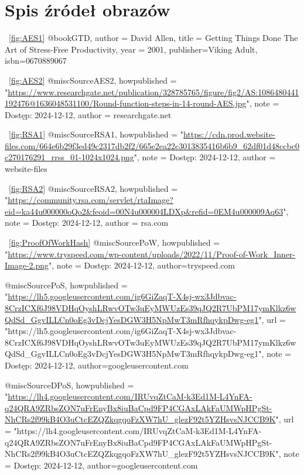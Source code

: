 \chapter{Spis źródeł obrazów}
\label{chap:Zrodla}
\figurename{~\ref{fig:AES1}}
@book{GTD,
author = {David Allen},
title = {Getting Things Done The Art of Stress-Free Productivity},
year = {2001},
publisher={Viking Adult},
isbn={0670889067}
}

\figurename{~\ref{fig:AES2}}
@misc{SourceAES2,
    howpublished = "\url{https://www.researchgate.net/publication/328785765/figure/fig2/AS:1086480441192476@1636048531100/Round-function-steps-in-14-round-AES.jpg}",
    note = {Dostęp: 2024-12-12},
    author = {researchgate.net}
}

\figurename{~\ref{fig:RSA1}}
@misc{SourceRSA1,
    howpublished = "\url{https://cdn.prod.website-files.com/664e6b29f3ed49c2317db2f2/665e2ea22c3013835416b6b9_62df01d48ccbc0c270176291_rrss_01-1024x1024.png}",
    note = {Dostęp: 2024-12-12},
author = {website-files}
}

\figurename{~\ref{fig:RSA2}}
@misc{SourceRSA2,
    howpublished = "\url{https://community.rsa.com/servlet/rtaImage?eid=ka44u000000oQo2&feoid=00N4u000004LDXp&refid=0EM4u000009Aq63}",
    note = {Dostęp: 2024-12-12},
author = {rsa.com}
}

\figurename{~\ref{fig:ProofOfWorkHash}}
@misc{SourcePoW,
    howpublished = "\url{https://www.tryspeed.com/wp-content/uploads/2022/11/Proof-of-Work_Inner-Image-2.png}",
    note = {Dostęp: 2024-12-12},
author={tryspeed.com}
}


@misc{SourcePoS,
    howpublished = "\url{https://lh5.googleusercontent.com/ig6GiZaqT-X4sj-wx3Jdbvac-8CrzICXf6J98VDHqOyshLRwvOTw3uEyMWUzEs39qJQ2R7UbPM17ymKlkz6wQdSd_GgvILLCn0oEg3vDcjYesDGW3H5NpMwT3mRfhqykpDwg-eg1}",
    url = "https://lh5.googleusercontent.com/ig6GiZaqT-X4sj-wx3Jdbvac-8CrzICXf6J98VDHqOyshLRwvOTw3uEyMWUzEs39qJQ2R7UbPM17ymKlkz6wQdSd_GgvILLCn0oEg3vDcjYesDGW3H5NpMwT3mRfhqykpDwg-eg1",
    note = {Dostęp: 2024-12-12},
author={googleusercontent.com}
}


@misc{SourceDPoS,
    howpublished = "\url{https://lh4.googleusercontent.com/IRUvqZtCaM-k3Ed1M-L4YnFA-q24QRA9ZRbsZON7uFrEnyBx8iuBaCpd9FP4CGAxLAkFaUMWpHPgSt-NhCRs2f99kB4O3uCtcEZQZkqgqoFzXW7hU_glezF92t5YZHsvsNJCCB9K}",
    url = "https://lh4.googleusercontent.com/IRUvqZtCaM-k3Ed1M-L4YnFA-q24QRA9ZRbsZON7uFrEnyBx8iuBaCpd9FP4CGAxLAkFaUMWpHPgSt-NhCRs2f99kB4O3uCtcEZQZkqgqoFzXW7hU_glezF92t5YZHsvsNJCCB9K",
    note = {Dostęp: 2024-12-12},
author={googleusercontent.com}
}


